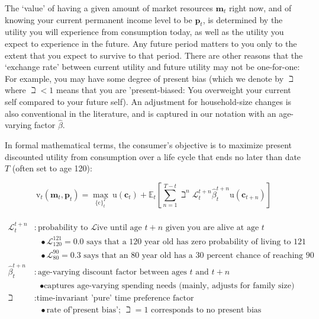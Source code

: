 \documentclass{article}
\newcommand{\uFunc}{\mathrm{u}}
\newcommand{\pLvl}{\mathbf{p}}
\newcommand{\mLvl}{\mathbf{m}}
\newcommand{\DiscFac}{\beta}
\newcommand{\cFunc}{\mathrm{c}}
\newcommand{\vFunc}{\mathrm{v}}
\newcommand{\Alive}{\mathcal{L}}
\newcommand{\cLvl}{\mathbf{c}}
\newcommand{\Ex}{\mathbb{E}}
\begin{document}
The `value' of having a given amount of market resources $\mLvl_{t}$ right now, and of knowing your current permanent income level to be $\pLvl_{t}$, is determined by the utility you will experience from consumption today, as well as the utility you expect to experience in the future. Any future period matters to you only to the extent that you expect to survive to that period. There are other reasons that the `exchange rate' between current utility and future utility may not be one-for-one: For example, you may have some degree of present bias (which we denote by $\beth$ where $\beth < 1$ means that you are 'present-biased: You overweight your current self compared to your future self). An adjustment for household-size changes is also conventional in the literature, and is captured in our notation with an age-varying factor $\hat{\DiscFac}$.

In formal mathematical terms, the consumer's objective is to maximize present discounted utility from consumption over a life cycle that ends no later than date $T$ (often set to age 120):

\begin{equation}
\label{eq:lifecyclemax}
\pmb{\vFunc}_{t}(\mLvl_{t},\pLvl_{t}) = \max_{\{\cFunc\}_{t}^{T}} ~ \uFunc(\cLvl_{t})+\Ex_{t}\left[\sum_{n=1}^{T-t} {\beth}^{n} \Alive_{t}^{t+n}\hat{\DiscFac}_{t}^{t+n} \uFunc(\cLvl_{t+n}) \right]
\end{equation}

\begin{align}
    \\ \Alive _{t}^{t+n} & : \text{probability to }\Alive\text{ive until age $t+n$ given you are alive at age $t$}
    \\ & {~~~}\bullet \text{$\Alive_{120}^{121} = 0.0$ says that a 120 year old has zero probability of living to 121}
    \\ & {~~~}\bullet \text{$\Alive_{80}^{90} = 0.3$ says that an 80 year old has a 30 percent chance of reaching 90}
    \\ \hat{\DiscFac}_{t}^{t+n} & : \text{age-varying discount factor between ages $t$ and $t+n$}
    \\ & {~~~} \bullet \text{captures age-varying spending needs (mainly, adjusts for family size)}
    \\ \beth & : \text{time-invariant 'pure' time preference factor}
    \\ & {~~~} \bullet \text{rate of'present bias'; $\beth=1$ corresponds to no present bias}
\end{align}
\end{document}
